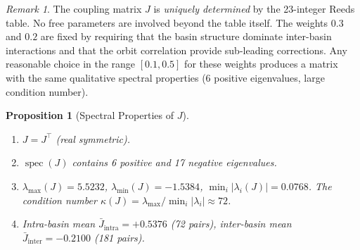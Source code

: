\documentclass[11pt,a4paper]{article}
\theoremstyle{plain}
\newtheorem{proposition}[theorem]{Proposition}
\theoremstyle{remark}
\newtheorem{remark}[theorem]{Remark}
\DeclareMathOperator{\spec}{spec}
\begin{document}
\begin{remark}\label{rem:J-uniqueness}
The coupling matrix $J$ is \emph{uniquely determined} by the 23-integer
Reeds table.  No free parameters are involved beyond the table itself.
The weights $0.3$ and $0.2$ are fixed by requiring that the basin structure
dominate inter-basin interactions and that the orbit correlation provide
sub-leading corrections.  Any reasonable choice in the range $[0.1,0.5]$
for these weights produces a matrix with the same qualitative spectral
properties (6 positive eigenvalues, large condition number).
\end{remark}

\begin{proposition}[Spectral Properties of $J$]\label{prop:J-spectrum}
\begin{enumerate}[nosep,label=(\roman*)]
  \item $J=J^\top$ (real symmetric).
  \item $\spec(J)$ contains 6 positive and 17 negative eigenvalues.
  \item $\lambda_{\max}(J)=5.5232$, $\lambda_{\min}(J)=-1.5384$,
        $\min_i|\lambda_i(J)|=0.0768$.
        The condition number $\kappa(J)=\lambda_{\max}/\min_i|\lambda_i|
        \approx 72$.
  \item Intra-basin mean $\bar{J}_{\mathrm{intra}}=+0.5376$ (72 pairs),
        inter-basin mean $\bar{J}_{\mathrm{inter}}=-0.2100$ (181 pairs).
\end{enumerate}
\end{proposition}
\end{document}

